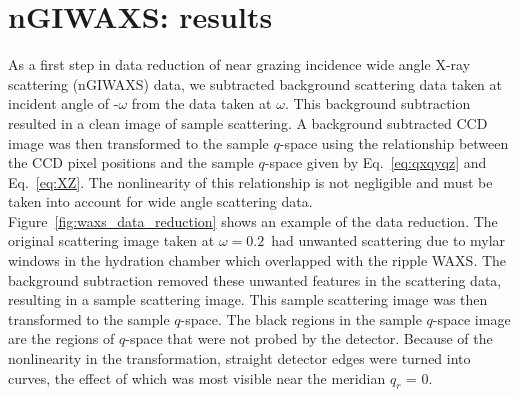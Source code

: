 


\newpage
\section{nGIWAXS: results}\label{sec:nGIWAXS_results}
As a first step in data reduction of near grazing incidence wide angle X-ray
scattering (nGIWAXS) data, we 
subtracted background scattering data taken at incident angle of -$\omega$ 
from the data taken at $\omega$. This background
subtraction resulted in a clean image of sample scattering. 
A background subtracted CCD image was then transformed to the
sample $q$-space using the relationship between the CCD 
pixel positions and the sample $q$-space
given by Eq.~\ref{eq:qxqyqz} and Eq.~\ref{eq:XZ}. The nonlinearity of this
relationship is
not negligible and must be taken into account for wide angle scattering data.
Figure~\ref{fig:waxs_data_reduction} shows an example of the data reduction.
The original scattering image taken at $\omega=0.2$\textdegree\ had unwanted
scattering due to mylar windows in the hydration chamber which
overlapped with the ripple WAXS.
The background subtraction removed these unwanted features in the scattering 
data, resulting in a sample scattering image. This sample scattering image
was then transformed to the sample $q$-space. 
The black regions in the sample $q$-space image are the regions of $q$-space that
were not probed by the detector. Because of the nonlinearity in the 
transformation, straight detector edges were turned into curves, the effect of
which was most visible near the meridian $q_r$ = 0.

